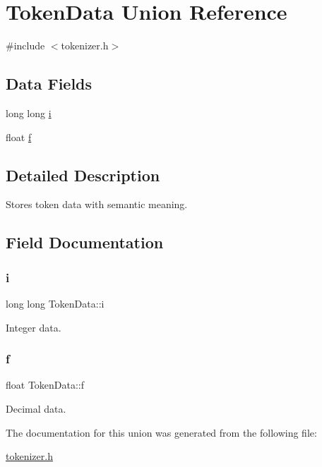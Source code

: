 \hypertarget{union_token_data}{}\section{Token\+Data Union Reference}
\label{union_token_data}


{\ttfamily \#include $<$tokenizer.\+h$>$}

\subsection*{Data Fields}
\begin{DoxyCompactItemize}
\item 
long long \hyperlink{union_token_data_a006c43861a35eae776cd580d82bbdfd4}{i}
\item 
float \hyperlink{union_token_data_affb76b1c0ea30bca741d3148601fee73}{f}
\end{DoxyCompactItemize}


\subsection{Detailed Description}
Stores token data with semantic meaning. 

\subsection{Field Documentation}
\mbox{\label{union_token_data_a006c43861a35eae776cd580d82bbdfd4}} 
\subsubsection{\texorpdfstring{i}{i}}
{\footnotesize\ttfamily long long Token\+Data\+::i}

Integer data. \mbox{\label{union_token_data_affb76b1c0ea30bca741d3148601fee73}} 
\subsubsection{\texorpdfstring{f}{f}}
{\footnotesize\ttfamily float Token\+Data\+::f}

Decimal data. 

The documentation for this union was generated from the following file\+:\begin{DoxyCompactItemize}
\item 
\hyperlink{tokenizer_8h}{tokenizer.\+h}\end{DoxyCompactItemize}
